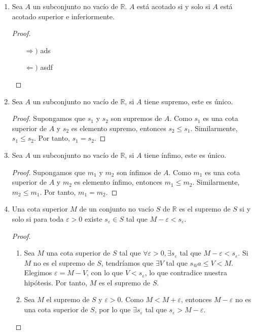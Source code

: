 \documentclass[11pt]{article}
\newcommand{\R}{\mathbb{R}}
\let\epsilon\varepsilon
\begin{document}
\begin{enumerate}
 \item Sea $A$ un subconjunto no vacío de $\R$. $A$ está acotado si y solo si $A$ está acotado superior e inferiormente.
 
 \begin{proof} \leavevmode
  \begin{itemize}
   \item[$\Rightarrow)$] ads
   \item[$\Leftarrow)$] asdf
  \end{itemize}
 \end{proof}

 \item Sea $A$ un subconjunto no vacío de $\R$, si $A$ tiene supremo, este es único.
 
 \begin{proof} 
  Supongamos que $s_1$ y $s_2$ son supremos de $A$. Como $s_1$ es una cota superior de $A$ y $s_2$ es elemento supremo, entonces $s_2\leq s_1$. Similarmente, $s_1\leq s_2$. Por tanto, $s_1=s_2$. 
 \end{proof}

 \item Sea $A$ un subconjunto no vacío de $\R$, si $A$ tiene ínfimo, este es único.
 
 \begin{proof} 
  Supongamos que $m_1$ y $m_2$ son ínfimos de $A$. Como $m_1$ es una cota superior de $A$ y $m_2$ es elemento ínfimo, entonces $m_1\leq m_2$. Similarmente, $m_2\leq m_1$. Por tanto, $m_1=m_2$. 
 \end{proof}

 \item Una cota superior $M$ de un conjunto no vacío $S$ de $\R$ es el supremo de $S$ si y solo si para toda $\varepsilon>0$ existe $s_\varepsilon \in S$ tal que $M-\varepsilon<s_\varepsilon$.

 \begin{proof} 
  \begin{enumerate}[label=\roman*)]
   \item Sea $M$ una cota superior de $S$ tal que $\forall \epsilon>0, \exists s_{\epsilon}$ tal que $M-\epsilon<s_{\epsilon}$. Si $M$ no es el supremo de $S$, tendríamos que $\exists V$ tal que $s_@a \leq V < M$. Elegimos $\epsilon = M-V$, con lo que $V<s_{\epsilon}$, lo que contradice nuestra hipótesis. Por tanto, $M$ es el supremo de $S$.
   \item Sea $M$ el supremo de $S$ y $\epsilon>0$. Como $M<M+\epsilon$, entonces $M-\epsilon$ no es una cota superior de $S$, por lo que $\exists s_\epsilon$ tal que $s_\epsilon>M-\epsilon$. \qedhere
   \end{enumerate} 
 \end{proof}
\end{enumerate}
\end{document}

